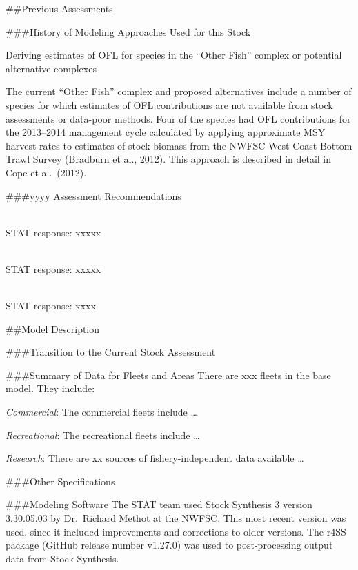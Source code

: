 \documentclass[12pt,]{article}
\begin{document}
\newpage

\#\#Previous Assessments

\#\#\#History of Modeling Approaches Used for this Stock

Deriving estimates of OFL for species in the ``Other Fish'' complex or
potential alternative complexes

The current ``Other Fish'' complex and proposed alternatives include a
number of species for which estimates of OFL contributions are not
available from stock assessments or data-poor methods. Four of the
species had OFL contributions for the 2013--2014 management cycle
calculated by applying approximate MSY harvest rates to estimates of
stock biomass from the NWFSC West Coast Bottom Trawl Survey (Bradburn et
al., 2012). This approach is described in detail in Cope et al.~(2012).

\#\#\#yyyy Assessment Recommendations

\begin{description}[style=unboxed]

  \item[Recommendation 1: ] \hfill \\

   STAT response: xxxxx

\item[Recommendation 2: ] \hfill \\

  STAT response: xxxxx

\item[Recommendation 3: ] \hfill \\

  STAT response: xxxx

  
\end{description}

\#\#Model Description

\#\#\#Transition to the Current Stock Assessment

\#\#\#Summary of Data for Fleets and Areas There are xxx fleets in the
base model. They include:

\emph{Commercial}: The commercial fleets include \ldots{}

\emph{Recreational}: The recreational fleets include \ldots{}

\emph{Research}: There are xx sources of fishery-independent data
available \ldots{}

\#\#\#Other Specifications

\#\#\#Modeling Software The STAT team used Stock Synthesis 3 version
3.30.05.03 by Dr.~Richard Methot at the NWFSC. This most recent version
was used, since it included improvements and corrections to older
versions. The r4SS package (GitHub release number v1.27.0) was used to
post-processing output data from Stock Synthesis.
\end{document}
